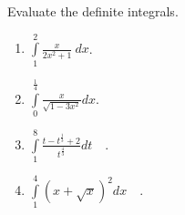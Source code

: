 Evaluate the definite integrals.
\begin{multicols}{2}
\begin{enumerate}
\item $\displaystyle\int\limits_{1}^{2} \frac{x}{2x^2+1 }  ~dx$.

\item $\displaystyle\int\limits_{0}^{\frac{1}4}\frac{x }{\sqrt{1-3x^2}}dx$.


\item $\displaystyle\int\limits_{1}^{8} \frac{t-t^{\frac{1}{3}}+2}{t^{\frac{4}{3}}} dt\quad .$

\item $\displaystyle\int\limits_{1}^{4} (x+\sqrt{x})^2 dx\quad .$


\end{enumerate}
\end{multicols}

